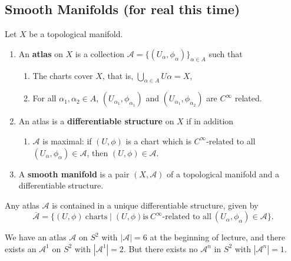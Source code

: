 \subsection{Smooth Manifolds (for real this time)}
\begin{definition}[]
    Let $X$ be a topological manifold. 
    \begin{enumerate}[label=(\roman*)]
        \item An \textbf{atlas} on $X$ is a collection $\mathcal{A} = \{(U_{\alpha },\phi _{\alpha })\} _{\alpha \in A}$ such that
            \begin{enumerate}
                \item The charts cover $X$, that is, $\bigcup_{\alpha \in A} U\alpha =X$,
                \item For all $\alpha_1,\alpha_2 \in A $, $(U_{\alpha_1} ,\phi_{\alpha_1 })$ and $(U_{\alpha_1 },\phi _{\alpha_2 })$ are $C^{\infty}$ related.
            \end{enumerate}
        \item An atlas is a \textbf{differentiable structure} on $X$ if in addition
            \begin{enumerate}[label=(c)]
                \item $\mathcal{A} $ is maximal: if $(U,\phi)$ is a chart which is $C^{\infty}$-related to all $(U_{\alpha },\phi_{\alpha }) \in \mathcal{A} $, then $(U, \phi) \in \mathcal{A} $.
            \end{enumerate}
        \item A \textbf{smooth manifold} is a pair $(X,\mathcal{A} )$ of a topological manifold and a differentiable structure.
    \end{enumerate}
\end{definition}
\begin{remark}
    Any atlas $\mathcal{A} $ is contained in a unique differentiable structure, given by \[
        \overline{\mathcal{A} }= \{(U, \phi) \ \text{charts}  \mid (U,\phi) \text{is} \ C^{\infty}\text{-related to all} \ (U _{\alpha}, \phi _{\alpha }) \in \mathcal{A} \} .
    \] 
\end{remark}
\begin{remark}
    We have an atlas $\mathcal{A} $ on $S^2$ with $| \mathcal{A} |=6$ at the beginning of lecture, and there exists an $\mathcal{A} ^1$ on $S^2$ with $| \mathcal{A} ^1|=2.$ But there exists no $\mathcal{A} ^{n}$ in $S^2$ with $|\mathcal{A} ^n |=1$.
\end{remark}

